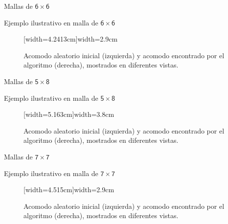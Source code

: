 \documentclass[14pt, aspectratio = 1610, xcolor=table, structureblod]{beamer}
\begin{document}
\begin{frame}{Mallas de $\mathsf{6\times 6}$}
	\vfill
	\Wider[1.85cm]{
	\begin{figure}[H]
	\end{figure}
	}%
\end{frame}

\begin{frame}{Ejemplo ilustrativo en malla de $\mathsf{6\times 6}$}
	\vskip -7pt%
	\begin{figure}[H]
		\caption{Acomodo aleatorio inicial (izquierda) y acomodo encontrado por el algoritmo (derecha), mostrados en diferentes vistas.}%
		[width=4.2413cm]{width=2.9cm}%
	\end{figure}
\end{frame}
	

\begin{frame}{Mallas de $\mathsf{5\times 8}$}
	\vfill
	\Wider[1.85cm]{
	\begin{figure}[H]
	\end{figure}
	}%
\end{frame}

\begin{frame}{Ejemplo ilustrativo en malla de $\mathsf{5\times 8}$}
	\captionsetup[figure]{belowskip = 4pt}%
	\vskip -6pt%
	\begin{figure}[H]
		\caption{Acomodo aleatorio inicial (izquierda) y acomodo encontrado por el algoritmo (derecha), mostrados en diferentes vistas.}%
		[width=5.163cm]{width=3.8cm}%
	\end{figure}
\end{frame}


\begin{frame}{Mallas de $\mathsf{7\times 7}$}
	\vfill
	\Wider[1.85cm]{
	\begin{figure}[H]
	\end{figure}
	}%
\end{frame}

\begin{frame}{Ejemplo ilustrativo en malla de $\mathsf{7\times 7}$}
	\captionsetup[figure]{belowskip = -4pt}%
	\vskip -7pt%
	\begin{figure}[H]
		\caption{Acomodo aleatorio inicial (izquierda) y acomodo encontrado por el algoritmo (derecha), mostrados en diferentes vistas.}%
		[width=4.515cm]{width=2.9cm}%
	\end{figure}
\end{frame}
\end{document}
